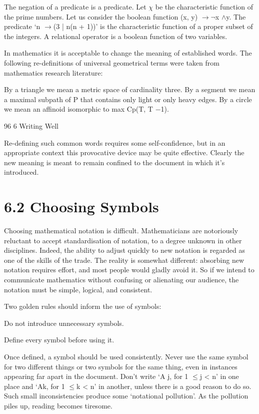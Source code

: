 \documentclass[11pt]{article}
\theoremstyle{plain}
\theoremstyle{definition}
\begin{document}
The negation of a predicate is a predicate. Let $\chi$ be the characteristic function of the prime numbers. Let us consider the boolean function (x, y) $\to$$\neg$x $\land$y. The predicate `n $\to$(3 | n(n + 1))' is the characteristic function of a proper subset of the integers. A relational operator is a boolean function of two variables.

In mathematics it is acceptable to change the meaning of established words. The following re-definitions of universal geometrical terms were taken from mathematics research literature:

By a triangle we mean a metric space of cardinality three. By a segment we mean a maximal subpath of P that contains only light or only heavy edges. By a circle we mean an affinoid isomorphic to max Cp(T, T $-$1).

96 6 Writing Well

Re-defining such common words requires some self-confidence, but in an appropriate context this provocative device may be quite effective. Clearly the new meaning is meant to remain confined to the document in which it's introduced.

\section{6.2 Choosing Symbols}

Choosing mathematical notation is difficult. Mathematicians are notoriously reluctant to accept standardisation of notation, to a degree unknown in other disciplines. Indeed, the ability to adjust quickly to new notation is regarded as one of the skills of the trade. The reality is somewhat different: absorbing new notation requires effort, and most people would gladly avoid it. So if we intend to communicate mathematics without confusing or alienating our audience, the notation must be simple, logical, and consistent.

Two golden rules should inform the use of symbols:

\textbullet{} Do not introduce unnecessary symbols.

\textbullet{} Define every symbol before using it.

Once defined, a symbol should be used consistently. Never use the same symbol for two different things or two symbols for the same thing, even in instances appearing far apart in the document. Don't write `A j, for 1 $\leq$j < n' in one place and `Ak, for 1 $\leq$k < n' in another, unless there is a good reason to do so. Such small inconsistencies produce some `notational pollution'. As the pollution piles up, reading becomes tiresome.
\end{document}
